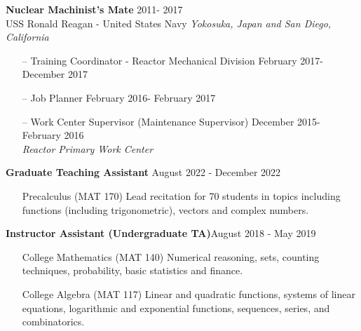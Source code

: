 \documentclass[a4paper,12pt]{article}
\begin{document}
\normalsize
\vspace{-1.2em}
\textbf{Nuclear Machinist's Mate} \hfill 2011- 2017 \\
USS Ronald Reagan - United States Navy \hfill \textit{Yokosuka, Japan and San Diego, California}\hspace{-.3em}
\vspace{-.5em}
\begin{itemize}[nosep,after=\strut, leftmargin=1em, itemsep=3pt]
\item[--] Training Coordinator - Reactor Mechanical Division \hfill February 2017- December 2017
\item[--] Job Planner \hfill February 2016- February 2017
\item[--] Work Center Supervisor (Maintenance Supervisor) \hfill December 2015- February 2016 \\
\footnotesize\textit{Reactor Primary Work Center}
\end{itemize}
\notrmalsize

\textbf{Graduate Teaching Assistant } \hfill August 2022 - December 2022 
\vspace{-.5em}
\begin{itemize}[nosep,after=\strut, leftmargin=1em, itemsep=1pt]
    \item[] \footnotesize Precalculus (MAT 170) Lead recitation for 70 students in topics including functions (including trigonometric), vectors and complex numbers.\normalsize
\end{itemize}

\textbf{Instructor Assistant (Undergraduate TA)}\hfill August 2018 - May 2019
\vspace{-.5em}
\begin{itemize}[nosep,after=\strut, leftmargin=1em, itemsep=0pt]
\item[] \footnotesize College Mathematics (MAT 140) Numerical reasoning, sets, counting techniques, probability, basic statistics and finance.
\item[] College Algebra (MAT 117)  Linear and quadratic functions, systems of linear equations, logarithmic and exponential functions, sequences, series, and combinatorics.\normalsize
\end{itemize}
\end{document}
